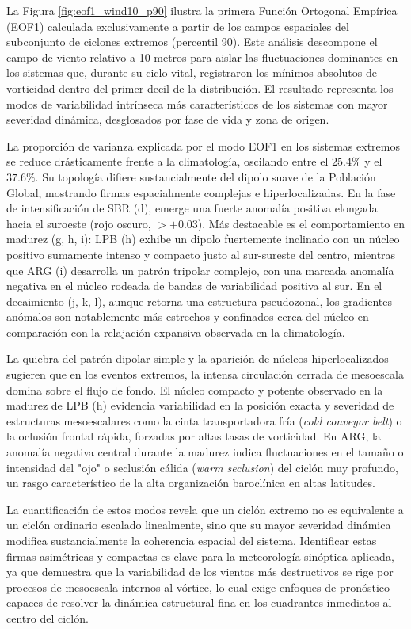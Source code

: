 La Figura \ref{fig:eof1_wind10_p90} ilustra la primera Función Ortogonal Empírica (EOF1) calculada exclusivamente a partir de los campos espaciales del subconjunto de ciclones extremos (percentil 90). Este análisis descompone el campo de viento relativo a 10 metros para aislar las fluctuaciones dominantes en los sistemas que, durante su ciclo vital, registraron los mínimos absolutos de vorticidad dentro del primer decil de la distribución. El resultado representa los modos de variabilidad intrínseca más característicos de los sistemas con mayor severidad dinámica, desglosados por fase de vida y zona de origen.

La proporción de varianza explicada por el modo EOF1 en los sistemas extremos se reduce drásticamente frente a la climatología, oscilando entre el $25.4\%$ y el $37.6\%$. Su topología difiere sustancialmente del dipolo suave de la Población Global, mostrando firmas espacialmente complejas e hiperlocalizadas. En la fase de intensificación de SBR (d), emerge una fuerte anomalía positiva elongada hacia el suroeste (rojo oscuro, $>+0.03$). Más destacable es el comportamiento en madurez (g, h, i): LPB (h) exhibe un dipolo fuertemente inclinado con un núcleo positivo sumamente intenso y compacto justo al sur-sureste del centro, mientras que ARG (i) desarrolla un patrón tripolar complejo, con una marcada anomalía negativa en el núcleo rodeada de bandas de variabilidad positiva al sur. En el decaimiento (j, k, l), aunque retorna una estructura pseudozonal, los gradientes anómalos son notablemente más estrechos y confinados cerca del núcleo en comparación con la relajación expansiva observada en la climatología.

La quiebra del patrón dipolar simple y la aparición de núcleos hiperlocalizados sugieren que en los eventos extremos, la intensa circulación cerrada de mesoescala domina sobre el flujo de fondo. El núcleo compacto y potente observado en la madurez de LPB (h) evidencia variabilidad en la posición exacta y severidad de estructuras mesoescalares como la cinta transportadora fría (\textit{cold conveyor belt}) o la oclusión frontal rápida, forzadas por altas tasas de vorticidad. En ARG, la anomalía negativa central durante la madurez indica fluctuaciones en el tamaño o intensidad del "ojo" o seclusión cálida (\textit{warm seclusion}) del ciclón muy profundo, un rasgo característico de la alta organización baroclínica en altas latitudes.

La cuantificación de estos modos revela que un ciclón extremo no es equivalente a un ciclón ordinario escalado linealmente, sino que su mayor severidad dinámica modifica sustancialmente la coherencia espacial del sistema. Identificar estas firmas asimétricas y compactas es clave para la meteorología sinóptica aplicada, ya que demuestra que la variabilidad de los vientos más destructivos se rige por procesos de mesoescala internos al vórtice, lo cual exige enfoques de pronóstico capaces de resolver la dinámica estructural fina en los cuadrantes inmediatos al centro del ciclón.

